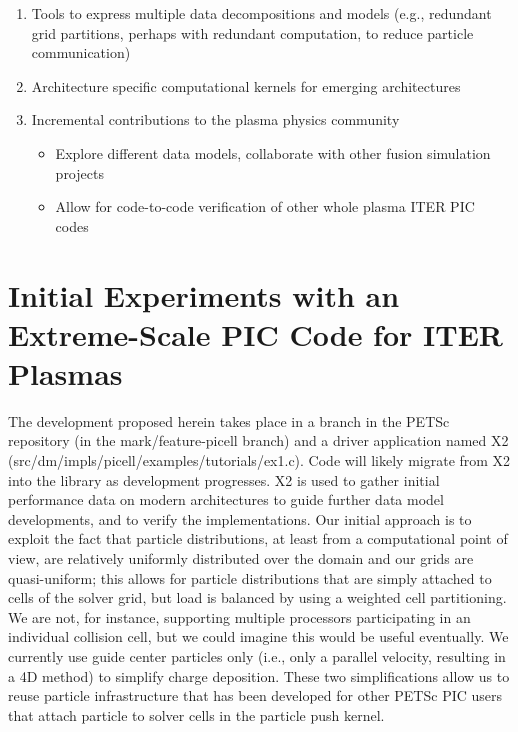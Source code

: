 \documentclass[review]{siamart}
\begin{document}
\begin{itemize}
\begin{enumerate}
\item Tools to express multiple data decompositions and models (e.g., redundant grid partitions, perhaps with redundant computation, to reduce particle communication)
\item Architecture specific computational kernels for emerging architectures \cite{KnepleyBrownMcInnesSmithRuppAdams2015}
\item Incremental contributions to the plasma physics community
\begin{itemize}
\item Explore different data models, collaborate with other fusion simulation projects
\item Allow for code-to-code verification of other whole plasma ITER PIC codes
\end{itemize}
\end{enumerate}
\end{itemize}

\section{Initial Experiments with an Extreme-Scale PIC Code for ITER Plasmas}
\label{sec:x2}

The development proposed herein takes place in a branch in the PETSc repository (in the mark/feature-picell branch) and a driver application named X2 (src/dm/impls/picell/examples/tutorials/ex1.c).
Code will likely migrate from X2 into the library as development progresses.
X2 is used to gather initial performance data on modern architectures to guide further data model developments, and to verify the implementations.
Our initial approach is to exploit the fact that particle distributions, at least from a computational point of view, are relatively uniformly distributed over the domain and our grids are quasi-uniform; this allows for particle distributions that are simply attached to cells of the solver grid, but load is balanced by using a weighted cell partitioning.
We are not, for instance, supporting multiple processors participating in an individual collision cell, but we could imagine this would be useful eventually.
We currently use guide center particles only (i.e., only a parallel velocity, resulting in a 4D method) to simplify charge deposition.
These two simplifications allow us to reuse particle infrastructure that has been developed for other PETSc PIC users \cite{may2014ptatin} that attach particle to solver cells in the particle push kernel.
\end{document}
